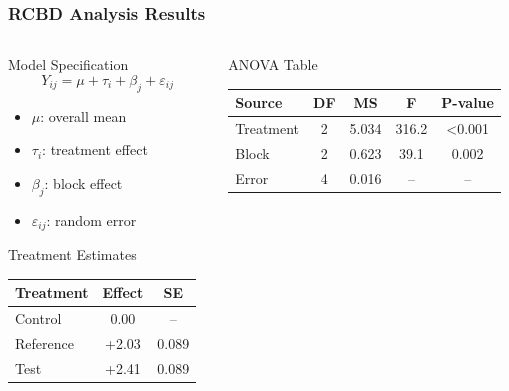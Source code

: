 \begin{frame}
    \frametitle{RCBD Analysis Results}
    
    \begin{columns}[T]
        \begin{column}{0.5\textwidth}
            \begin{block}{Model Specification}
                $$Y_{ij} = \mu + \tau_i + \beta_j + \varepsilon_{ij}$$
                \begin{itemize}
                    \item $\mu$: overall mean
                    \item $\tau_i$: treatment effect
                    \item $\beta_j$: block effect
                    \item $\varepsilon_{ij}$: random error
                \end{itemize}
            \end{block}
            
            \begin{block}{Treatment Estimates}
                \scriptsize
                \begin{tabular}{lcc}
                    \hline
                    Treatment & Effect & SE \\
                    \hline
                    Control & 0.00 & -- \\
                    Reference & +2.03 & 0.089 \\
                    Test & +2.41 & 0.089 \\
                    \hline
                \end{tabular}
            \end{block}
        \end{column}
        
        \begin{column}{0.5\textwidth}
            \begin{block}{ANOVA Table}
                \scriptsize
                \begin{tabular}{lcccc}
                    \hline
                    Source & DF & MS & F & P-value \\
                    \hline
                    Treatment & 2 & 5.034 & 316.2 & <0.001 \\
                    Block & 2 & 0.623 & 39.1 & 0.002 \\
                    Error & 4 & 0.016 & -- & -- \\
                    \hline
                \end{tabular}
            \end{block}
            

\end{column}
\end{columns}
\end{frame}
